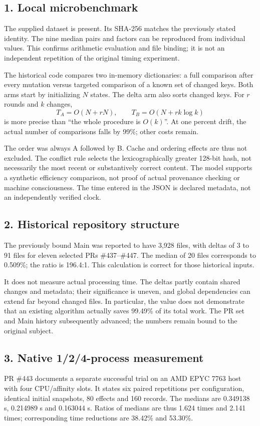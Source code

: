 \begin{cols}
\subsection*{1. Local microbenchmark}
The supplied dataset is present. Its SHA-256 matches the previously stated identity. The nine median pairs and factors can be reproduced from individual values. This confirms arithmetic evaluation and file binding; it is not an independent repetition of the original timing experiment. 

The historical code compares two in-memory dictionaries: a full comparison after every mutation versus targeted comparison of a known set of changed keys. Both arms start by initializing $N$ states. The delta arm also sorts changed keys. For $r$ rounds and $k$ changes,
\[
 T_A=O(N+rN),\qquad T_B=O(N+rk\log k)
\]
is more precise than ``the whole procedure is $O(k)$''. At one percent drift, the actual number of comparisons falls by 99\%; other costs remain.

The order was always A followed by B. Cache and ordering effects are thus not excluded. The conflict rule selects the lexicographically greater 128-bit hash, not necessarily the most recent or substantively correct content. The model supports a synthetic efficiency comparison, not proof of actual provenance checking or machine consciousness. The time entered in the JSON is declared metadata, not an independently verified clock.

\subsection*{2. Historical repository structure}
The previously bound Main was reported to have 3,928 files, with deltas of 3 to 91 files for eleven selected PRs \#437--\#447. The median of 20 files corresponds to 0.509\%; the ratio is 196.4:1. This calculation is correct for those historical inputs. 

It does not measure actual processing time. The deltas partly contain shared changes and metadata; their significance is uneven, and global dependencies can extend far beyond changed files. In particular, the value does not demonstrate that an existing algorithm actually saves 99.49\% of its total work. The PR set and Main history subsequently advanced; the numbers remain bound to the original subject.

\subsection*{3. Native 1/2/4-process measurement}
PR \#443 documents a separate successful trial on an AMD EPYC 7763 host with four CPU/affinity slots. It states six paired repetitions per configuration, identical initial snapshots, 80 effects and 160 records. The medians are 0.349138 s, 0.214989 s and 0.163044 s. Ratios of medians are thus 1.624 times and 2.141 times; corresponding time reductions are 38.42\% and 53.30\%. 


\end{cols}
